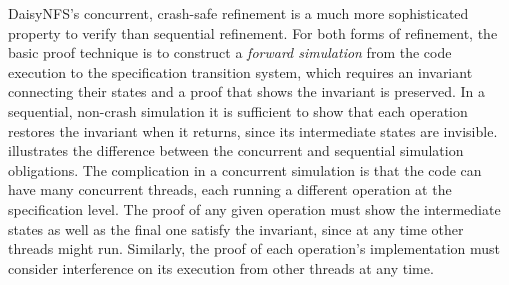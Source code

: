 DaisyNFS's concurrent, crash-safe refinement is a much more sophisticated property to verify
than sequential refinement. For both forms of refinement, the basic proof technique is to construct a
\emph{forward simulation} from the code execution to the specification
transition system, which requires an invariant connecting their states and a
proof that shows the invariant is preserved. In a sequential, non-crash
simulation it is sufficient to show that each operation restores the invariant
when it returns, since its intermediate states are invisible.
 illustrates the difference between the
concurrent and sequential simulation obligations. The complication in a
concurrent simulation is that the code can have many concurrent threads, each
running a different operation at the specification level. The
proof of any given operation must show the intermediate states as well as the
final one satisfy the invariant, since at any
time other threads might run. Similarly, the proof of each operation's implementation must
consider interference on its execution from other threads at any time.

